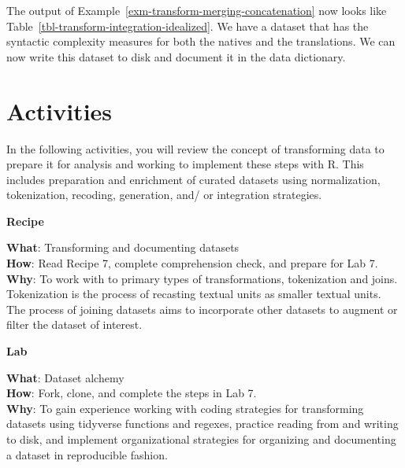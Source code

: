 \documentclass[
  letterpaper,
  krantz1]{latex/krantz-mod}
\theoremstyle{definition}
\theoremstyle{definition}
\theoremstyle{remark}
\begin{document}
The output of Example~\ref{exm-transform-merging-concatenation} now
looks like Table~\ref{tbl-transform-integration-idealized}. We have a
dataset that has the syntactic complexity measures for both the natives
and the translations. We can now write this dataset to disk and document
it in the data dictionary.

\section*{Activities}\label{activities-5}


In the following activities, you will review the concept of transforming
data to prepare it for analysis and working to implement these steps
with R. This includes preparation and enrichment of curated datasets
using normalization, tokenization, recoding, generation, and/ or
integration strategies.

\begin{tcolorbox}[enhanced jigsaw, leftrule=.75mm, colframe=quarto-callout-color-frame, left=2mm, colback=white, toprule=.15mm, breakable, arc=.35mm, opacityback=0, bottomrule=.15mm, rightrule=.15mm]

\textbf{ Recipe}

\textbf{What}: Transforming and documenting datasets\\
\textbf{How}: Read Recipe 7, complete comprehension check, and prepare
for Lab 7.\\
\textbf{Why}: To work with to primary types of transformations,
tokenization and joins. Tokenization is the process of recasting textual
units as smaller textual units. The process of joining datasets aims to
incorporate other datasets to augment or filter the dataset of interest.

\end{tcolorbox}

\pagebreak

\begin{tcolorbox}[enhanced jigsaw, leftrule=.75mm, colframe=quarto-callout-color-frame, left=2mm, colback=white, toprule=.15mm, breakable, arc=.35mm, opacityback=0, bottomrule=.15mm, rightrule=.15mm]

\textbf{ Lab}

\textbf{What}: Dataset alchemy\\
\textbf{How}: Fork, clone, and complete the steps in Lab 7.\\
\textbf{Why}: To gain experience working with coding strategies for
transforming datasets using tidyverse functions and regexes, practice
reading from and writing to disk, and implement organizational
strategies for organizing and documenting a dataset in reproducible
fashion.

\end{tcolorbox}
\end{document}
